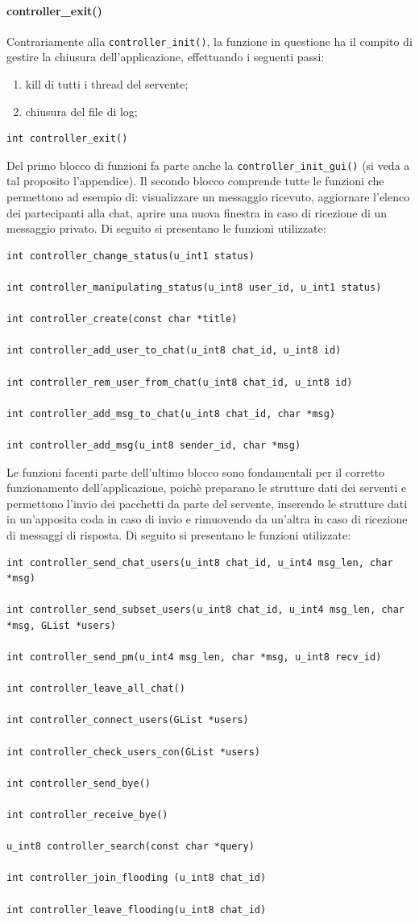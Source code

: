 \paragraph{controller\_exit()}
Contrariamente alla \texttt{controller\_init()}, la funzione in questione ha il compito di gestire la chiusura dell'applicazione, effettuando i seguenti passi:
\begin{enumerate}
\item kill di tutti i thread del servente;
\item chiusura del file di log;
\end{enumerate}
\begin{lstlisting}
int controller_exit()
\end{lstlisting}
Del primo blocco di funzioni fa parte anche la \texttt{controller\_init\_gui()} (si veda a tal proposito l'appendice). Il secondo blocco comprende tutte le funzioni che permettono ad esempio di: visualizzare un messaggio ricevuto, aggiornare l'elenco dei partecipanti alla chat, aprire una nuova finestra in caso di ricezione di un messaggio privato. Di seguito si presentano le funzioni utilizzate:
\begin{lstlisting}
int controller_change_status(u_int1 status)

int controller_manipulating_status(u_int8 user_id, u_int1 status)

int controller_create(const char *title)

int controller_add_user_to_chat(u_int8 chat_id, u_int8 id)

int controller_rem_user_from_chat(u_int8 chat_id, u_int8 id)

int controller_add_msg_to_chat(u_int8 chat_id, char *msg)

int controller_add_msg(u_int8 sender_id, char *msg)
\end{lstlisting}
Le funzioni facenti parte dell'ultimo blocco sono fondamentali per il corretto funzionamento dell'applicazione, poichè preparano le strutture dati dei serventi e permettono l'invio dei pacchetti da parte del servente, inserendo le strutture dati in un'apposita coda in caso di invio e rimuovendo da un'altra in caso di ricezione di messaggi di risposta.
Di seguito si presentano le funzioni utilizzate:
\begin{lstlisting}
int controller_send_chat_users(u_int8 chat_id, u_int4 msg_len, char *msg)

int controller_send_subset_users(u_int8 chat_id, u_int4 msg_len, char *msg, GList *users)

int controller_send_pm(u_int4 msg_len, char *msg, u_int8 recv_id)

int controller_leave_all_chat()

int controller_connect_users(GList *users)

int controller_check_users_con(GList *users)

int controller_send_bye()

int controller_receive_bye()

u_int8 controller_search(const char *query)

int controller_join_flooding (u_int8 chat_id)

int controller_leave_flooding(u_int8 chat_id)
\end{lstlisting}
